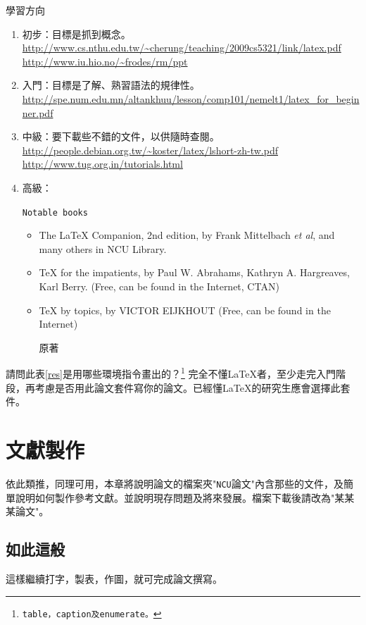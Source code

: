 \begin{table}[hbt!]
\caption{學習方向}
\begin{enumerate}
\item{\color{blue} 初步：目標是抓到概念。}\\
\url{http://www.cs.nthu.edu.tw/~cherung/teaching/2009cs5321/link/latex.pdf}\\
\url{http://www.iu.hio.no/~frodes/rm/ppt}
\item{\color{cyan} 入門：目標是了解、熟習語法的規律性。\\ 
\url{http://spe.num.edu.mn/altankhuu/lesson/comp101/nemelt1/latex_for_beginner.pdf}}
\item{\color{yellow}
中級：要下載些不錯的文件，以供隨時查閱。}\\ 
\url{http://people.debian.org.tw/~koster/latex/lshort-zh-tw.pdf}\\
\url{http://www.tug.org.in/tutorials.html}
\item
高級：{\tt Notable books 
\begin{itemize}
\item The \LaTeX{ }Companion, 2nd edition, by  Frank Mittelbach {\it et al}, and many others in NCU Library.
\item TeX for the impatients, by Paul W. Abrahams, Kathryn A. Hargreaves, Karl Berry. (Free, can be found in the Internet, CTAN)
\item TeX by topics, by VICTOR EIJKHOUT (Free, can be found in the Internet)
\item [原著] \cite{knu84,lam94}
\end{itemize}}
\end{enumerate}
\label{res}
\end{table}%
請問此表\ref{res}是用哪些環境指令畫出的？\footnote{\tt table，caption及enumerate。}
完全不懂\LaTeX{}者，至少走完入門階段，再考慮是否用此論文套件寫你的論文。已經懂\LaTeX{}的研究生應會選擇此套件。

\vfil  {}

\chapter{文獻製作}
依此類推，同理可用，本章將說明論文的檔案夾"{\tt NCU}論文"內含那些的文件，及簡單說明如何製作參考文獻。並說明現存問題及將來發展。檔案下載後請改為"某某某論文"。
\section{如此這般}
這樣繼續打字，製表，作圖，就可完成論文撰寫。
